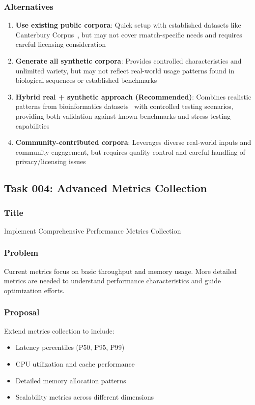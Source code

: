 \documentclass[11pt,a4paper]{article}
\begin{document}
\subsubsection{Alternatives}
\begin{enumerate}
    \item \textbf{Use existing public corpora}: Quick setup with established datasets like Canterbury Corpus~\cite{canterbury_corpus}, but may not cover rmatch-specific needs and requires careful licensing consideration
    \item \textbf{Generate all synthetic corpora}: Provides controlled characteristics and unlimited variety, but may not reflect real-world usage patterns found in biological sequences or established benchmarks
    \item \textbf{Hybrid real + synthetic approach (Recommended)}: Combines realistic patterns from bioinformatics datasets~\cite{durbin1998biological} with controlled testing scenarios, providing both validation against known benchmarks and stress testing capabilities
    \item \textbf{Community-contributed corpora}: Leverages diverse real-world inputs and community engagement, but requires quality control and careful handling of privacy/licensing issues
\end{enumerate}

\subsection{Task 004: Advanced Metrics Collection}

\subsubsection{Title}
Implement Comprehensive Performance Metrics Collection

\subsubsection{Problem}
Current metrics focus on basic throughput and memory usage. More detailed metrics are needed to understand performance characteristics and guide optimization efforts.

\subsubsection{Proposal}
Extend metrics collection to include:
\begin{itemize}
    \item Latency percentiles (P50, P95, P99)
    \item CPU utilization and cache performance
    \item Detailed memory allocation patterns
    \item Scalability metrics across different dimensions
\end{itemize}
\end{document}
